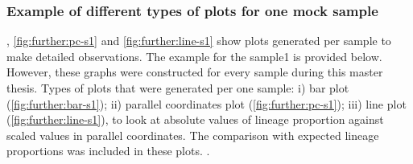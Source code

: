         \subsubsection{Example of different types of plots for one mock sample} 
        , \cref{fig:further:pc-s1} and \cref{fig:further:line-s1} show plots generated per sample to make detailed observations. The example for the sample1 is provided below. However, these graphs were constructed for every sample during this master thesis. Types of plots that were generated per one sample: i) bar plot (\cref{fig:further:bar-s1}); ii) parallel coordinates plot (\cref{fig:further:pc-s1}); iii) line plot (\cref{fig:further:line-s1}), to look at absolute values of lineage proportion against scaled values in parallel coordinates. The comparison with expected lineage proportions was included in these plots.
.
